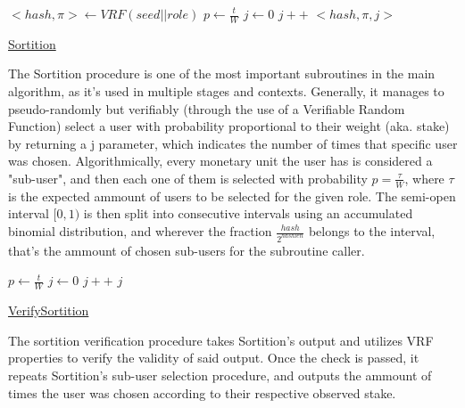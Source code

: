 \documentclass[10pt,a4paper]{article}
\begin{document}
\begin{algorithm}
    \begin{algorithmic}[H]
        \State $<hash, \pi> \gets VRF(seed||role)$
        \State $p \gets \frac{t}{W}$
        \State $j \gets 0$
        \While{$\frac{hash}{2^{hashlen}}\notin [ \sum_{k=0}^jB(k;w,p), \sum_{k=0}^{j+1}B(k;w,p))$}
            \State $j++$
        \EndWhile
        \Return $<hash,\pi,j>$
    \EndFunction
    \end{algorithmic}
    \caption{\underline{Sortition}}
\end{algorithm}


The Sortition procedure is one of the most important subroutines in the main algorithm, as it's used in multiple stages and contexts.
Generally, it manages to pseudo-randomly but verifiably (through the use of a Verifiable Random Function) select a user with probability proportional
to their weight (aka. stake) by returning a j parameter, which indicates the number of times that specific user was chosen.
Algorithmically, every monetary unit the user has is considered a "sub-user", and then each one of them is selected with probability $p = \frac{\tau}{W}$,
where $\tau$ is the expected ammount of users to be selected for the given role.
The semi-open interval $[0,1)$ is then split into consecutive intervals using an accumulated binomial distribution, and wherever the fraction $\frac{hash}{2^{hashlen}}$
belongs to the interval, that's the ammount of chosen sub-users for the subroutine caller.


\begin{algorithm}
    \begin{algorithmic}[H]
        \State $p \gets \frac{t}{W}$
        \State $j \gets 0$
        \While{$\frac{hash}{2^{hashlen}} \notin [\sum_{k=0}^jB(k;w,p), \sum_{k=0}^{j+1}B(k;w,p))$}
            \State $j++$
        \EndWhile
        \Return $j$
    \EndFunction
    \end{algorithmic}
    \caption{\underline{VerifySortition}}
\end{algorithm}

The sortition verification procedure takes Sortition's output and utilizes VRF properties to verify the validity of said output.
Once the check is passed, it repeats Sortition's sub-user selection procedure, and outputs the ammount of times the user was chosen
according to their respective observed stake.
\end{document}
